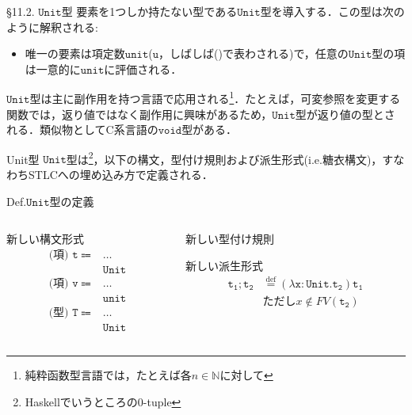 \documentclass[9pt]{beamer}
\begin{document}
\begin{frame}{\S11.2. $\mathtt{Unit}$型}
    要素を1つしか持たない型である$\mathtt{Unit}$型を導入する．この型は次のように解釈される:\begin{itemize}
    \item 唯一の要素は項定数$\mathtt{unit}$($\mathtt{u}$，しばしば()で表わされる)で，任意の$\mathtt{Unit}$型の項は一意的に$\mathtt{unit}$に評価される．
    \end{itemize}
    $\mathtt{Unit}$型は主に副作用を持つ言語で応用される\footnote{純粋函数型言語では，たとえば各$n\in\mathbb{N}$に対して}．たとえば，可変参照を変更する関数では，返り値ではなく副作用に興味があるため，$\mathtt{Unit}$型が返り値の型とされる．類似物としてC系言語の$\mathtt{void}$型がある．
    \end{frame}
\begin{frame}{Unit型}
$\mathtt{Unit}$型は\footnote{Haskellでいうところの0-tuple}，以下の構文，型付け規則および派生形式(i.e.糖衣構文)，すなわちSTLCへの埋め込み方で定義される．
\begin{dblock}{Def.$\mathtt{Unit}$型の定義}
	\begin{columns}
		\begin{column}{0.30\textwidth}
			新しい構文形式
			\begin{align*}
			\mathtt{\text{(項)\ }t}\Coloneq&\ldots\\
                                        &\mathtt{Unit}
			\end{align*}
        \begin{align*}
                \mathtt{\text{(項)\ }v}\Coloneq&\ldots\\
                &\mathtt{unit}
            \end{align*}
            \begin{align*}
                \mathtt{\text{(型)\ }T}\Coloneq&\ldots\\
                &\mathtt{Unit}
            \end{align*}
		\end{column}\begin{column}{0.66\textwidth}
			新しい型付け規則\begin{prooftree}
			\end{prooftree}
            新しい派生形式
            \begin{align*}
                \mathtt{t_{1};t_{2}}&\stackrel{\text{def}}{=}(\lambda \mathtt{x:Unit. t_{2}})\mathtt{t_{1}}\\
                    &\text{ただし}x\notin FV(\mathtt{t_{2}})
            \end{align*}
		\end{column}
	\end{columns}\end{dblock}
\end{frame}
\end{document}
